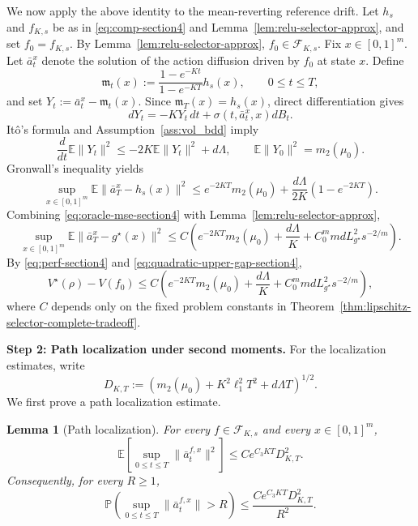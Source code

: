 \documentclass{article}
\newtheorem{lem}[thm]{Lemma}
\newcommand{\1}{\mathbbm{1}}
\numberwithin{equation}{section}
\begin{document}
We now apply the above identity to the mean-reverting reference drift. Let \(h_s\) and \(f_{K,s}\) be as in \eqref{eq:comp-section4} and Lemma~\ref{lem:relu-selector-approx}, and set \(f_0=f_{K,s}\). By Lemma~\ref{lem:relu-selector-approx}, \(f_0\in\mathcal F_{K,s}\). Fix \(x\in[0,1]^m\). Let \(\bar a_t^x\) denote the solution of the action diffusion driven by \(f_0\) at state \(x\). Define
\[
 \mathfrak m_t(x):=\frac{1-e^{-Kt}}{1-e^{-KT}}h_s(x),
 \qquad 0\le t\le T,
\]
and set \(Y_t:=\bar a_t^x-\mathfrak m_t(x)\). Since \(\mathfrak m_T(x)=h_s(x)\), direct differentiation gives
\[
 dY_t=-KY_t\,dt+\sigma(t,\bar a_t^x,x)dB_t.
\]
It\^o's formula and Assumption~\ref{ass:vol_bdd} imply
\[
 \frac{d}{dt}\mathbb E\|Y_t\|^2
 \le -2K\mathbb E\|Y_t\|^2+d\Lambda,
 \qquad
 \mathbb E\|Y_0\|^2=m_2(\mu_0).
\]
Gronwall's inequality yields
\begin{equation}
\label{eq:oracle-mse-section4}
 \sup_{x\in[0,1]^m}\mathbb E\|\bar a_T^x-h_s(x)\|^2
 \le e^{-2KT}m_2(\mu_0)+\frac{d\Lambda}{2K}(1-e^{-2KT}).
\end{equation}
Combining \eqref{eq:oracle-mse-section4} with Lemma~\ref{lem:relu-selector-approx},
\begin{equation}
\label{eq:oracle-mse-2-section4}
 \sup_{x\in[0,1]^m}\mathbb E\|\bar a_T^x-g^\star(x)\|^2
 \le C\left(e^{-2KT}m_2(\mu_0)+\frac{d\Lambda}{K}+C_0^mmdL_{g^\star}^2s^{-2/m}\right).
\end{equation}
By \eqref{eq:perf-section4} and \eqref{eq:quadratic-upper-gap-section4},
\begin{equation}
\label{eq:oracle-section4}
 V^\star(\rho)-V(f_0)
 \le
 C\left(e^{-2KT}m_2(\mu_0)+\frac{d\Lambda}{K}+C_0^mmdL_{g^\star}^2s^{-2/m}\right),
\end{equation}
where \(C\) depends only on the fixed problem constants in Theorem~\ref{thm:lipschitz-selector-complete-tradeoff}.

\medskip
\noindent\textbf{Step 2: Path localization under second moments.}
For the localization estimates, write
\[
D_{K,T}:=
\left(m_2(\mu_0)+K^2\ell_1^2T^2+d\Lambda T\right)^{1/2}.
\]
We first prove a path localization estimate.

\begin{lem}[Path localization]
\label{lem:loc-section4}
For every \(f\in\mathcal F_{K,s}\) and every \(x\in[0,1]^m\),
\begin{equation}
\label{eq:path-moment-section4}
 \mathbb E\left[\sup_{0\le t\le T}\|\bar a_t^{f,x}\|^2\right]
 \le C e^{C_3KT}D_{K,T}^2.
\end{equation}
Consequently, for every \(R\ge1\),
\begin{equation}
\label{eq:path-tail-section4}
 \mathbb P\left(\sup_{0\le t\le T}\|\bar a_t^{f,x}\|>R\right)
 \le
 \frac{C e^{C_3KT}D_{K,T}^2}{R^2}.
\end{equation}
\end{lem}
\end{document}

